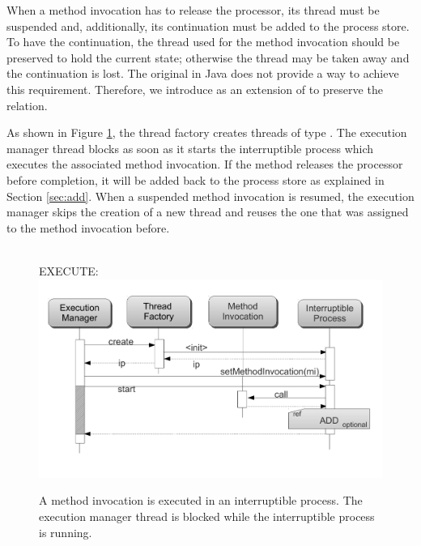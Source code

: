 When a method invocation has to release the processor, its thread must
be suspended and, additionally, its continuation must be added to the
process store. To have the continuation, the thread used for the method
invocation should be preserved to hold the current state; otherwise the
thread may be taken away and the continuation is lost.
The original  in Java does not provide a way to achieve this
requirement.
Therefore, we introduce  as an extension of
 to preserve the relation.


As shown in Figure \ref{fig:execute}, the thread factory creates threads of type  {}.
The execution manager thread blocks as soon as it starts the interruptible process which executes the associated  method invocation. 
If the method releases the processor before completion, it will be added back to the process store as explained in Section \ref{sec:add}.
When a suspended method invocation is resumed, the execution manager skips the creation of a new thread and  reuses the one that was assigned to the method invocation before.

\begin{figure}[t]
~\\EXECUTE:\\
 \includegraphics[scale=0.35]{figs/seq-diag-3}
\vspace{-.7cm}
\caption{A method invocation is executed in an interruptible process. The execution manager thread is blocked while the interruptible process is running.}
  \label{fig:execute}
\end{figure}


